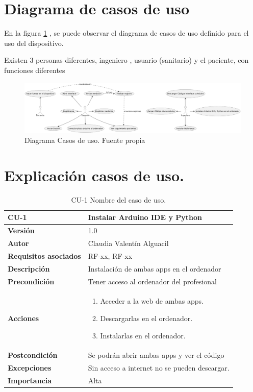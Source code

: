 
\section{Diagrama de casos de uso}
En la figura \ref{fig:Diagrama Casos de uso} , se puede observar el diagrama de casos de uso definido para el uso del dispositivo. 

Existen 3 personas diferentes, ingeniero , usuario (sanitario) y el paciente, con funciones diferentes 
\begin{figure}
    \centering
    \includegraphics[width=1\linewidth]{img/Diagrama Casos de Uso.png}
    \caption{Diagrama Casos de uso. Fuente propia}
    \label{fig:Diagrama Casos de uso}
\end{figure}
\section{Explicación casos de uso.}


\begin{table}[p]
	\centering
	\begin{tabularx}{\linewidth}{ p{} p{} }
		\toprule
		\textbf{CU-1}    & \textbf{Instalar Arduino IDE y Python}\\
		\toprule
		\textbf{Versión}              & 1.0    \\
		\textbf{Autor}                & Claudia Valentín Alguacil \\
		\textbf{Requisitos asociados} & RF-xx, RF-xx \\
		\textbf{Descripción}          & Instalación de ambas apps en el ordenador \\
		\textbf{Precondición}         & Tener acceso al ordenador del profesional \\
		\textbf{Acciones}             &
		\begin{enumerate}
			\def\labelenumi{\arabic{enumi}.}
			\tightlist
			\item Acceder a la web de ambas apps.
			\item Descargarlas en el ordenador.
                \item Instalarlas en el ordenador.
		\end{enumerate}\\
		\textbf{Postcondición}        &  Se podrán abrir ambas apps y ver el código \\
		\textbf{Excepciones}          & Sin acceso a internet no se pueden descargar. \\
		\textbf{Importancia}          & Alta \\
		\bottomrule
	\end{tabularx}
	\caption{CU-1 Nombre del caso de uso.}
\end{table}

